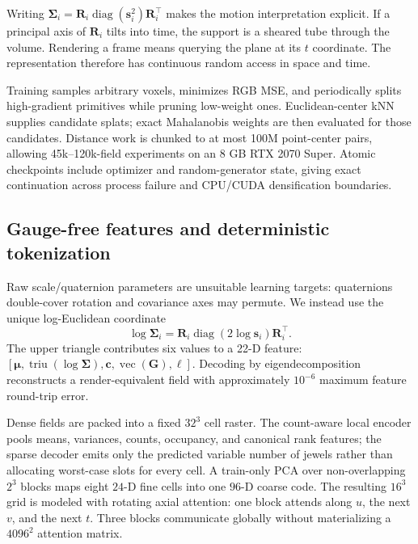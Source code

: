 \documentclass[10pt]{article}
\begin{document}
Writing $\boldsymbol\Sigma_i=\mathbf{R}_i\operatorname{diag}(\mathbf{s}_i^2)\mathbf{R}_i^\top$
makes the motion interpretation explicit. If a principal axis of $\mathbf{R}_i$ tilts into time,
the support is a sheared tube through the volume. Rendering a frame means querying the plane at its
$t$ coordinate. The representation therefore has continuous random access in space and time.

Training samples arbitrary voxels, minimizes RGB MSE, and periodically splits high-gradient
primitives while pruning low-weight ones. Euclidean-center kNN supplies candidate splats; exact
Mahalanobis weights are then evaluated for those candidates. Distance work is chunked to at most
100M point-center pairs, allowing 45k--120k-field experiments on an 8 GB RTX 2070 Super. Atomic
checkpoints include optimizer and random-generator state, giving exact continuation across process
failure and CPU/CUDA densification boundaries.

\subsection{Gauge-free features and deterministic tokenization}

Raw scale/quaternion parameters are unsuitable learning targets: quaternions double-cover rotation
and covariance axes may permute. We instead use the unique log-Euclidean coordinate
\begin{equation}
\log\boldsymbol\Sigma_i=\mathbf{R}_i\operatorname{diag}(2\log\mathbf{s}_i)\mathbf{R}_i^\top.
\end{equation}
The upper triangle contributes six values to a 22-D feature:
$[\boldsymbol\mu,\operatorname{triu}(\log\boldsymbol\Sigma),\mathbf{c},
\operatorname{vec}(\mathbf{G}),\ell]$. Decoding by eigendecomposition reconstructs a render-equivalent
field with approximately $10^{-6}$ maximum feature round-trip error.

Dense fields are packed into a fixed $32^3$ cell raster. The count-aware local encoder pools means,
variances, counts, occupancy, and canonical rank features; the sparse decoder emits only the
predicted variable number of jewels rather than allocating worst-case slots for every cell. A
train-only PCA over non-overlapping $2^3$ blocks maps eight $24$-D fine cells into one $96$-D coarse
code. The resulting $16^3$ grid is modeled with rotating axial attention: one block attends along
$u$, the next $v$, and the next $t$. Three blocks communicate globally without materializing a
$4096^2$ attention matrix.
\end{document}
